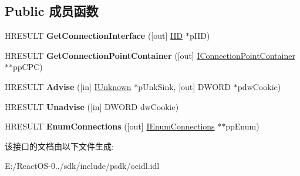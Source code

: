 \subsection*{Public 成员函数}
\begin{DoxyCompactItemize}
\item 
\mbox{\label{interface_i_connection_point_acf296a3b449310751aec6408851c0e9f}} 
H\+R\+E\+S\+U\+LT {\bfseries Get\+Connection\+Interface} (\mbox{[}out\mbox{]} \hyperlink{struct___i_i_d}{I\+ID} $\ast$p\+I\+ID)
\item 
\mbox{\label{interface_i_connection_point_af04596f368889bcd138b07ae2810ec80}} 
H\+R\+E\+S\+U\+LT {\bfseries Get\+Connection\+Point\+Container} (\mbox{[}out\mbox{]} \hyperlink{interface_i_connection_point_container}{I\+Connection\+Point\+Container} $\ast$$\ast$pp\+C\+PC)
\item 
\mbox{\label{interface_i_connection_point_acb7f2971a54f9bf46fb4db8a72d48faa}} 
H\+R\+E\+S\+U\+LT {\bfseries Advise} (\mbox{[}in\mbox{]} \hyperlink{interface_i_unknown}{I\+Unknown} $\ast$p\+Unk\+Sink, \mbox{[}out\mbox{]} D\+W\+O\+RD $\ast$pdw\+Cookie)
\item 
\mbox{\label{interface_i_connection_point_a37e80d12c3af560557aaccf7d43af15f}} 
H\+R\+E\+S\+U\+LT {\bfseries Unadvise} (\mbox{[}in\mbox{]} D\+W\+O\+RD dw\+Cookie)
\item 
\mbox{\label{interface_i_connection_point_a823257121394b2836761513fb02a5a07}} 
H\+R\+E\+S\+U\+LT {\bfseries Enum\+Connections} (\mbox{[}out\mbox{]} \hyperlink{interface_i_enum_connections}{I\+Enum\+Connections} $\ast$$\ast$pp\+Enum)
\end{DoxyCompactItemize}


该接口的文档由以下文件生成\+:\begin{DoxyCompactItemize}
\item 
E\+:/\+React\+O\+S-\/0../sdk/include/psdk/ocidl.\+idl\end{DoxyCompactItemize}
